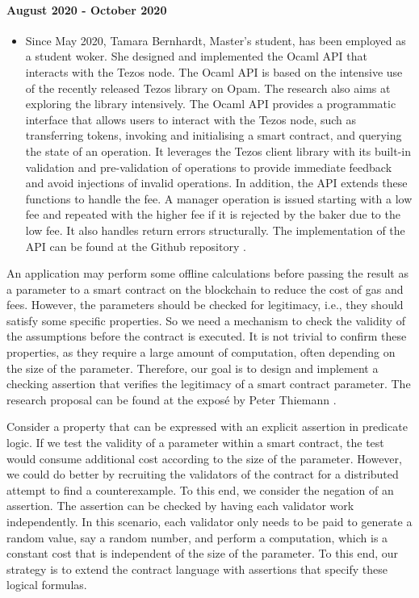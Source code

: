 \documentclass[a4paper,11pt]{article}
\begin{document}
\paragraph{August 2020 - October 2020} 
\begin{itemize}
\item
Since May 2020, Tamara Bernhardt, Master's student, has been employed as a student woker. She designed and implemented the Ocaml API that interacts with the Tezos node. The Ocaml API is based on the intensive use of the recently released Tezos library on Opam. The research  also aims at exploring the library intensively. The Ocaml API provides a programmatic interface that allows users to interact with the Tezos node, such as transferring tokens, invoking and initialising a smart contract, and querying the state of an operation. It leverages the Tezos client library with its built-in validation and pre-validation of operations to provide immediate feedback and avoid injections of invalid operations. In addition, the API extends these functions to handle the fee. A manager operation is issued starting with a low fee and repeated with the higher fee if it is rejected by the baker due to the low fee. It also handles return errors structurally. The implementation of the API can be found at the Github repository \cite{tezos-api}.

\end{itemize}
An application may perform some offline calculations before passing the result as a parameter to a smart contract on the blockchain to reduce the cost of gas and fees. However, the parameters should be checked for legitimacy, i.e., they should satisfy some specific properties. So we need a mechanism to check the validity of the assumptions before the contract is executed. It is not trivial to confirm these properties, as they  require a large amount of computation, often depending on the size of the parameter. Therefore, our goal is to design and implement a checking assertion that verifies the legitimacy of a smart contract parameter. The research proposal can be found at the expos\'{e} by Peter Thiemann \cite{expose}.

Consider a property that can be expressed with an explicit assertion in predicate logic. If we test the validity of a parameter within a smart contract, the test would consume additional cost according to the size of the parameter. However, we could do better by recruiting the validators of the contract for a distributed attempt to find a counterexample. To this end, we consider the negation of an assertion. The assertion can be checked by having each validator work independently. In this scenario, each validator only needs to be paid to generate a random value, say a random number, and perform a computation, which is a constant cost that is independent of the size of the parameter. To this end, our strategy is to extend the contract language with assertions that specify these logical formulas.
\end{document}

